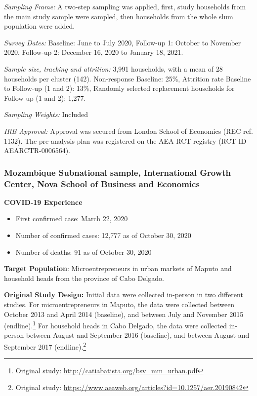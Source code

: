 \documentclass[
  12pt,
]{article}
\begin{document}
\emph{Sampling Frame:} A two-step sampling was applied, first, study households from the main study sample were sampled, then households from the whole slum population were added.

\emph{Survey Dates:}
Baseline: June to July 2020, Follow-up 1: October to November 2020, Follow-up 2: December 16, 2020 to January 18, 2021.

\emph{Sample size, tracking and attrition:} 3,991 households, with a mean of 28 households per cluster (142). Non-response Baseline: 25\%, Attrition rate Baseline to Follow-up (1 and 2): 13\%, Randomly selected replacement households for Follow-up (1 and 2): 1,277.

\emph{Sampling Weights:} Included

\emph{IRB Approval:} Approval was secured from London School of Economics (REC ref. 1132). The pre-analysis plan was registered on the AEA RCT registry (RCT ID AEARCTR-0006564).

\hypertarget{mozambique-subnational-sample-international-growth-center-nova-school-of-business-and-economics}{%
\subsubsection*{Mozambique Subnational sample, International Growth Center, Nova School of Business and Economics}\label{mozambique-subnational-sample-international-growth-center-nova-school-of-business-and-economics}}

\textbf{COVID-19 Experience}

\begin{itemize}
\item First confirmed case: March 22, 2020
\item Number of confirmed cases:  12,777 as of October 30, 2020 
\item Number of deaths:  91 as of October 30, 2020
\end{itemize}

\textbf{Target Population}: Microentrepreneurs in urban markets of Maputo and household heads from the province of Cabo Delgado.

\textbf{Original Study Design:} Initial data were collected in-person in two different studies. For microentrepreneurs in Maputo, the data were collected between October 2013 and April 2014 (baseline), and between July and November 2015 (endline).\footnote{Original study: \url{http://catiabatista.org/bsv_mm_urban.pdf}} For household heads in Cabo Delgado, the data were collected in-person between August and September 2016 (baseline), and between August and September 2017 (endline).\footnote{Original study: \url{https://www.aeaweb.org/articles?id=10.1257/aer.20190842}}
\end{document}
